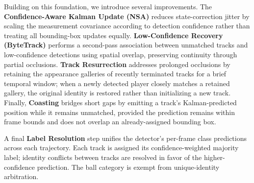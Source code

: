 Building on this foundation, we introduce several improvements.
The \textbf{Confidence-Aware Kalman Update (NSA)} reduces state-correction jitter by scaling the measurement covariance according to detection confidence rather than treating all bounding-box updates equally.
\textbf{Low-Confidence Recovery (ByteTrack)} \cite{bytetrack} performs a second-pass association between unmatched tracks and low-confidence detections using spatial overlap, preserving continuity through partial occlusions.
\textbf{Track Resurrection} addresses prolonged occlusions by retaining the appearance galleries of recently terminated tracks for a brief temporal window; when a newly detected player closely matches a retained gallery, the original identity is restored rather than initializing a new track.
Finally, \textbf{Coasting} bridges short gaps by emitting a track's Kalman-predicted position while it remains unmatched, provided the prediction remains within frame bounds and does not overlap an already-assigned bounding box.

A final \textbf{Label Resolution} step unifies the detector's per-frame class predictions across each trajectory.
Each track is assigned its confidence-weighted majority label; identity conflicts between tracks are resolved in favor of the higher-confidence prediction.
The ball category is exempt from unique-identity arbitration.



